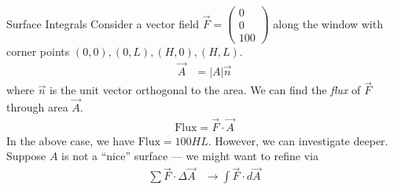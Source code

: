 \documentclass[8pt]{extarticle}
\begin{document}
  \begin{problem}{Surface Integrals}
    Consider a vector field $\vec{F} = \begin{pmatrix}0\\0\\100\end{pmatrix}$ along the window with corner points $(0,0),(0,L),(H,0),(H,L)$.
    \begin{align*}
      \vec{A} &= |A|\vec{n}
    \end{align*}
    where $\vec{n}$ is the unit vector orthogonal to the area. We can find the \textit{flux} of $\vec{F}$ through area $\vec{A}$.
    \begin{align*}
      \text{Flux} = \vec{F} \cdot \vec{A}
    \end{align*}
    In the above case, we have $\text{Flux} = 100HL$. However, we can investigate deeper.\\

    Suppose $A$ is not a ``nice'' surface --- we might want to refine via
    \begin{align*}
      \sum \vec{F}\cdot \Delta \vec{A} &\rightarrow \int \vec{F} \cdot d\vec{A}
    \end{align*}
  \end{problem}
\end{document}
